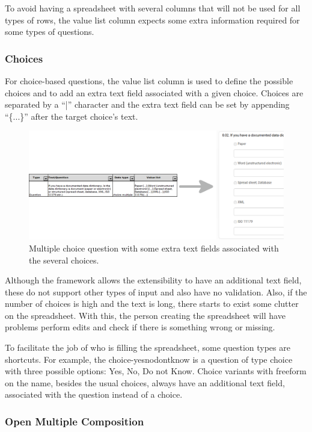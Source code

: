 To avoid having a spreadsheet with several columns that will not be used for all types of rows, the value list column expects some extra information required for some types of questions.

\subsubsection*{Choices}

For choice-based questions, the value list column is used to define the possible choices and to add an extra text field associated with a given choice.
Choices are separated by a ``|'' character and the extra text field can be set by appending ``\{...\}'' after the target choice's text.

\begin{figure}[H]
    \center
    \includegraphics[width=\textwidth]{choice-freeforms}
    \caption{Multiple choice question with some extra text fields associated with the several choices.}
\end{figure}

Although the framework allows the extensibility to have an additional text field, these do not support other types of input and also have no validation.
Also, if the number of choices is high and the text is long, there starts to exist some clutter on the spreadsheet.
With this, the person creating the spreadsheet will have problems perform edits and check if there is something wrong or missing.

To facilitate the job of who is filling the spreadsheet, some question types are shortcuts.
For example, the choice-yesnodontknow is a question of type choice with three possible options: Yes, No, Do not Know.
Choice variants with freeform on the name, besides the usual choices, always have an additional text field, associated with the question instead of a choice.

\subsubsection*{Open Multiple Composition}

